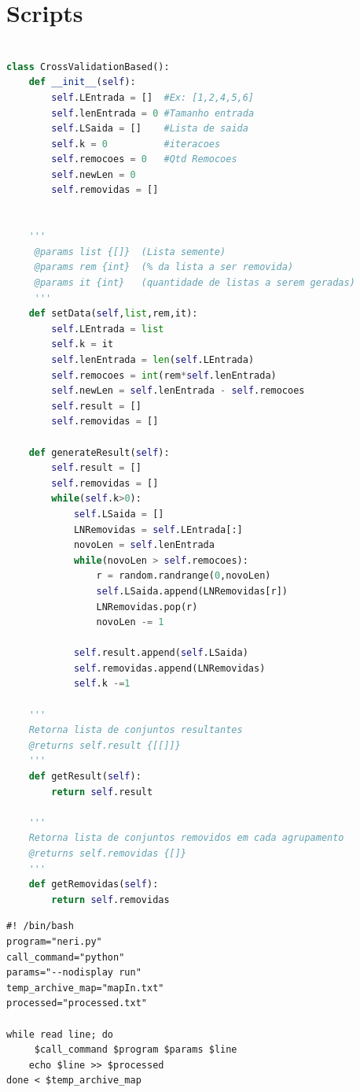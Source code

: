 


\chapter{Scripts}
\label{appendice_scripts}

\tiny
\label{CVV_script}
\begin{lstlisting}[caption={Script em Python para geração dos experimentos com remoção de mais de um gene semente.},label=getBlockStatic,language=Python]

class CrossValidationBased():
	def __init__(self):
		self.LEntrada = []  #Ex: [1,2,4,5,6]
		self.lenEntrada = 0 #Tamanho entrada
		self.LSaida = []    #Lista de saida
		self.k = 0          #iteracoes
		self.remocoes = 0   #Qtd Remocoes
		self.newLen = 0 
		self.removidas = []


	''' 
	 @params list {[]}	(Lista semente)
	 @params rem {int}	(% da lista a ser removida)
	 @params it {int}	(quantidade de listas a serem geradas)
	 ''' 
	def setData(self,list,rem,it):
		self.LEntrada = list
		self.k = it
		self.lenEntrada = len(self.LEntrada)
		self.remocoes = int(rem*self.lenEntrada)
		self.newLen = self.lenEntrada - self.remocoes
		self.result = []
		self.removidas = []
		
	def generateResult(self):
		self.result = []
		self.removidas = []
		while(self.k>0):
			self.LSaida = []
			LNRemovidas = self.LEntrada[:]
			novoLen = self.lenEntrada
			while(novoLen > self.remocoes):
				r = random.randrange(0,novoLen)
				self.LSaida.append(LNRemovidas[r])
				LNRemovidas.pop(r)
				novoLen -= 1

			self.result.append(self.LSaida)
			self.removidas.append(LNRemovidas)
			self.k -=1

    '''
    Retorna lista de conjuntos resultantes
    @returns self.result {[[]]}
    '''
	def getResult(self):
		return self.result

    '''
    Retorna lista de conjuntos removidos em cada agrupamento
    @returns self.removidas {[]}
    '''
	def getRemovidas(self):
		return self.removidas


\end{lstlisting}



\tiny
\label{shell_run_all}
\begin{lstlisting}[caption={Script em \textsl{Shell} para execução automatizada dos experimentos.},label=getBlockStatic,language=Shell]
#! /bin/bash
program="neri.py"
call_command="python"
params="--nodisplay run"
temp_archive_map="mapIn.txt"
processed="processed.txt"

while read line; do
	 $call_command $program $params $line
	echo $line >> $processed
done < $temp_archive_map

\end{lstlisting}



